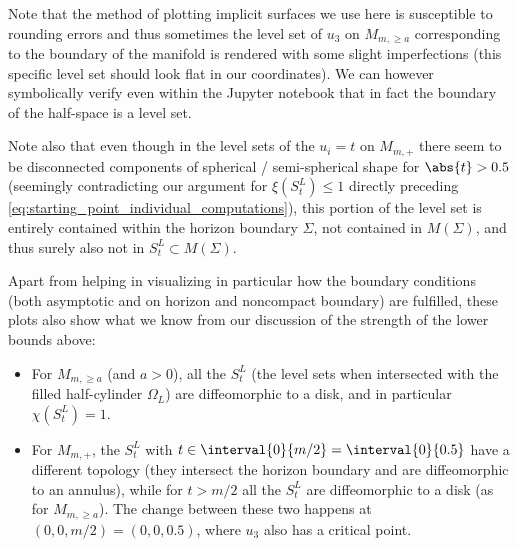 \documentclass[titlepage,numbers=noenddot,oneside,%
cleardoublepage=empty,paper=a4,fontsize=11pt,%
english,%
]{scrartcl}
\begin{document}
Note that the method of plotting implicit surfaces we use here is susceptible to rounding errors and thus sometimes the level set of \( u_3 \) on \( M_{m,\geq a} \) corresponding to the boundary of the manifold is rendered with some slight imperfections (this specific level set should look flat in our coordinates). We can however symbolically verify even within the Jupyter notebook that in fact the boundary of the half-space is a level set.

Note also that even though in the level sets of the \( u_i=t \) on \( M_{m,+} \) there seem to be disconnected components of spherical / semi-spherical shape for \( \abs{t}>0.5 \) (seemingly contradicting our argument for \( \xi(S_t^L)\leq 1 \) directly preceding \cref{eq:starting_point_individual_computations}), this portion of the level set is entirely contained within the horizon boundary \( \Sigma \), \ie not contained in \( M(\Sigma) \), and thus surely also not in \( S_t^L\subset M(\Sigma) \).

Apart from helping in visualizing in particular how the boundary conditions (both asymptotic and on horizon and noncompact boundary) are fulfilled, these plots also show what we know from our discussion of the strength of the lower bounds above: 
\begin{itemize}
    \item For \( M_{m,\geq a} \) (and \( a>0 \)), all the \( S_t^L \) (\ie the level sets when intersected with the filled half-cylinder \( \Omega_L \)) are diffeomorphic to a disk, and in particular \( \chi(S_t^L)=1 \). 
    \item For \( M_{m,+} \), the \( S_t^L \) with \( t\in \interval{0}{m/2}=\interval{0}{0.5} \) have a different topology (they intersect the horizon boundary and are diffeomorphic to an annulus), while for \( t>m/2 \) all the \( S_t^L \) are diffeomorphic to a disk (as for \( M_{m,\geq a} \)). The change between these two happens at \( (0,0,m/2)=(0,0,0.5) \), where \( u_3 \) also has a critical point.
\end{itemize}
\end{document}
